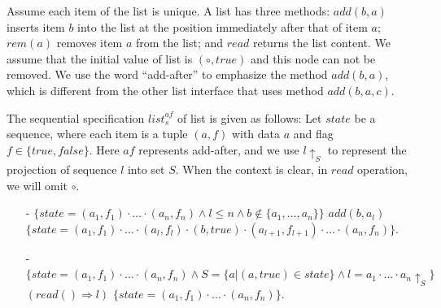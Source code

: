 {\begin{example}
\label{definition:sequential specification of list with add-after interface}
Assume each item of the list is unique. A list has three methods: $\mathit{add}(b,a)$ inserts item $b$ into the list at the position immediately after that of item $a$; $\mathit{rem}(a)$ removes item $a$ from the list; and $\mathit{read}$ returns the list content. We assume that the initial value of list is $(\circ,\mathit{true})$ and this node can not be removed. We use the word ``add-after'' to emphasize the method $\mathit{add}(b,a)$, which is different from the other list interface that uses method $\mathit{add}(b,a,c)$.

The sequential specification $\mathit{list}_s^{\mathit{af}}$ of list is given as follows: Let $\mathit{state}$ be a sequence, where each item is a tuple $(a,f)$ with data $a$ and flag $f \in \{ \mathit{true},\mathit{false} \}$. Here $\mathit{af}$ represents add-after, and we use $l \uparrow_{S}$ to represent the projection of sequence $l$ into set $S$. When the context is clear, in $\mathit{read}$ operation, we will omit $\circ$.
\begin{itemize}
\setlength{\itemsep}{0.5pt}
\item[-] $\{ \mathit{state} = (a_1,f_1) \cdot \ldots \cdot (a_n,f_n) \wedge l \leq n \wedge b \notin \{ a_1, \ldots, a_n \} \}$ $add(b,a_l)$ $\{ \mathit{state} = (a_1,f_1) \cdot \ldots \cdot (a_l,f_l) \cdot (b,\mathit{true}) \cdot (a_{l+1},f_{l+1}) \cdot \ldots \cdot (a_n,f_n) \}$.
\item[-] $\{ \mathit{state} = (a_1,f_1) \cdot \ldots \cdot (a_n,f_n) \wedge S = \{ a \vert (a,\mathit{true}) \in \mathit{state} \} \wedge l = a_1 \cdot \ldots \cdot a_n \uparrow_{S} \}$ $(read() \Rightarrow l)$ $\{ \mathit{state} = (a_1,f_1) \cdot \ldots \cdot (a_n,f_n) \}$.
\end{itemize}
\end{example}



}
